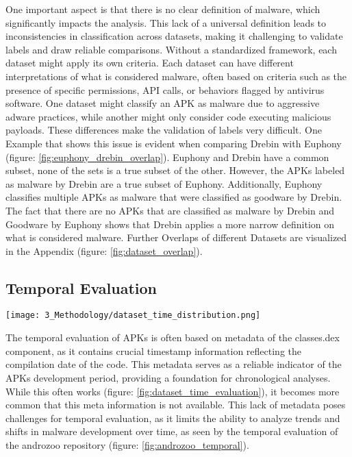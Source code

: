 One important aspect is that there is no clear definition of malware, 
which significantly impacts the analysis. 
This lack of a universal definition leads to inconsistencies in classification across datasets, 
making it challenging to validate labels and draw reliable comparisons. 
Without a standardized framework, each dataset might apply its own criteria.
Each dataset can have different interpretations of what is considered malware, 
often based on criteria such as the presence of specific permissions, 
API calls, or behaviors flagged by antivirus software. 
One dataset might classify an APK as malware due to aggressive adware practices, 
while another might only consider code executing malicious payloads. 
These differences make the validation of labels very difficult.
One Example that shows this issue is evident when comparing Drebin with Euphony 
(figure: \ref{fig:euphony_drebin_overlap}).
Euphony and Drebin have a common subset, none of the sets is a true subset of the other.
However, the APKs labeled as malware by Drebin are a true subset of Euphony.
Additionally, Euphony classifies multiple APKs as malware that were classified as goodware by Drebin.
The fact that there are no APKs that are classified as malware by Drebin and Goodware 
by Euphony shows that Drebin applies a more narrow definition on what is considered malware.
Further Overlaps of different Datasets are visualized in the Appendix 
(figure: \ref{fig:dataset_overlap}).

\subsection{Temporal Evaluation}

\begin{figure*}[b]
    \centering
    \begin{minipage}{1.5\textwidth}
        \centering
        \texttt{[image: 3\_Methodology/dataset\_time\_distribution.png]}
        \captionsetup{width=\textwidth}
        \caption{\label{fig:dataset_time_evaluation}
        Temporal distribution of Android APKs across three datasets (Drebin, Transcend, and DexRay), 
        categorized into goodware and malware.
        The Data is derived from metadata of the classes.dex file of each APK.
        }
    \end{minipage}
\end{figure*}

The temporal evaluation of APKs is often based on metadata of the classes.dex component, 
as it contains crucial timestamp information reflecting the compilation date of the code. 
This metadata serves as a reliable indicator of the APKs development period, 
providing a foundation for chronological analyses.
While this often works (figure: \ref{fig:dataset_time_evaluation}), 
it becomes more common that this meta information is not available. 
This lack of metadata poses challenges for temporal evaluation, 
as it limits the ability to analyze trends and shifts in malware development over time, 
as seen by the temporal evaluation of the androzoo repository 
(figure: \ref{fig:androzoo_temporal}).


